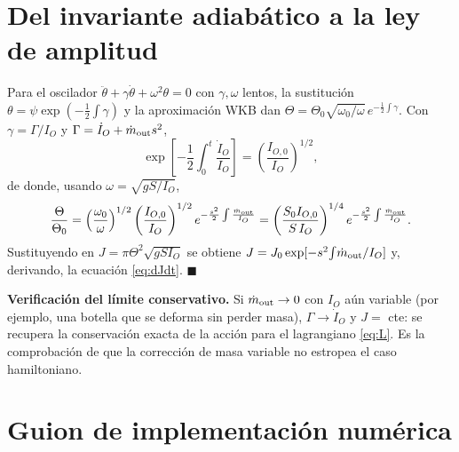 \documentclass[11pt,a4paper]{article}
\begin{document}
\section{Del invariante adiabático a la ley de amplitud}

Para el oscilador $\ddot\theta+\gamma\dot\theta+\omega^2\theta=0$ con $\gamma,\omega$ lentos, la
sustitución $\theta=\psi\exp(-\frac12\int\gamma)$ y la aproximación WKB dan
$\Theta=\Theta_0\sqrt{\omega_0/\omega}\,e^{-\frac12\int\gamma}$.
Con $\gamma=\Gamma/I_O$ y $\Gamma=\dot I_O+\dot m_{\rm out}s^2$,
\begin{equation}
\exp\left[-\frac12\int_0^t\frac{\dot I_O}{I_O}\right]=\left(\frac{I_{O,0}}{I_O}\right)^{1/2},
\end{equation}
de donde, usando $\omega=\sqrt{gS/I_O}$,
\begin{equation}
\frac{\Theta}{\Theta_0}
=\left(\frac{\omega_0}{\omega}\right)^{1/2}\left(\frac{I_{O,0}}{I_O}\right)^{1/2}
e^{-\frac{s^2}{2}\int\frac{\dot m_{\rm out}}{I_O}}
=\left(\frac{S_0 I_{O,0}}{S\,I_O}\right)^{1/4}e^{-\frac{s^2}{2}\int\frac{\dot m_{\rm out}}{I_O}} .
\end{equation}
Sustituyendo en $J=\pi\Theta^2\sqrt{gSI_O}$ se obtiene $J=J_0\exp[-s^2\!\int\!\dot m_{\rm out}/I_O]$
y, derivando, la ecuación \eqref{eq:dJdt}. $\blacksquare$

\medskip
\noindent\textbf{Verificación del límite conservativo.} Si $\dot m_{\rm out}\to0$ con $I_O$ aún
variable (por ejemplo, una botella que se deforma sin perder masa), $\Gamma\to\dot I_O$ y
$J=$ cte: se recupera la conservación exacta de la acción para el lagrangiano \eqref{eq:L}.
Es la comprobación de que la corrección de masa variable no estropea el caso hamiltoniano.

\section{Guion de implementación numérica}
\end{document}
